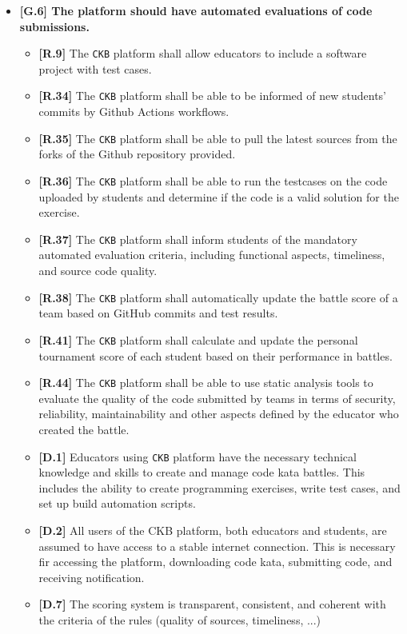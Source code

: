 \begin{itemize}
        \item \textbf{{[G.6]} The platform should have automated evaluations of code submissions. }
        \begin{itemize}
            \item \textbf{[R.9]} The \verb|CKB| platform shall allow educators to include a software project with test cases.
            \item \textbf{[R.34]} The \verb|CKB| platform shall be able to be informed of new students' commits by Github Actions workflows.
            \item \textbf{[R.35]} The \verb|CKB| platform shall be able to pull the latest sources from the forks of the Github repository provided.
            \item \textbf{[R.36]} The \verb|CKB| platform shall be able to run the testcases on the code uploaded by students and determine if the code is a valid solution for the exercise.
            \item \textbf{[R.37]} The \verb|CKB| platform shall inform students of the mandatory automated evaluation criteria, including functional aspects, timeliness, and source code quality.
            \item \textbf{[R.38]} The \verb|CKB| platform shall automatically update the battle score of a team based on GitHub commits and test results.
            \item \textbf{[R.41]} The \verb|CKB| platform shall calculate and update the personal tournament score of each student based on their performance in battles.
            \item \textbf{[R.44]} The \verb|CKB| platform shall be able to use static analysis tools to evaluate the quality of the code submitted by teams in terms of security, reliability, maintainability and other aspects defined by the educator who created the battle. 
            \item \textbf{[D.1]} Educators using \verb|CKB| platform have the necessary technical knowledge and skills to create and manage code kata battles. 
            This includes the ability to create programming exercises, write test cases, and set up build automation scripts.
            \item \textbf{[D.2]} All users of the CKB platform, both educators and students, are assumed to have access to a stable internet connection. This is
            necessary fir accessing the platform, downloading code kata, submitting code, and receiving notification. 
            \item \textbf{[D.7]} The scoring system is transparent, consistent, and coherent with the criteria of the rules (quality of sources, timeliness, ...)


\end{itemize}
\end{itemize}
